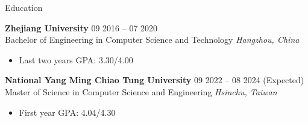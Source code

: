 \documentclass{resume}
\begin{document}

\begin{rSection}{Education}

{\bf Zhejiang University} \hfill {09 2016 – 07 2020}\\
Bachelor of Engineering in Computer Science and Technology \hfill \textit{Hangzhou, China}
\begin{itemize}
    \item Last two years GPA: 3.30/4.00
\end{itemize}

{\bf National Yang Ming Chiao Tung University} \hfill {09 2022 – 08 2024 (Expected)}\\
Master of Science in Computer Science and Engineering \hfill \textit{Hsinchu, Taiwan}
\begin{itemize}
    \item First year GPA: 4.04/4.30
\end{itemize}

\end{rSection}

\end{document}

